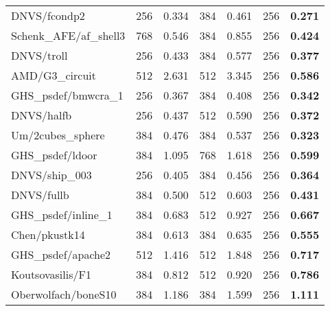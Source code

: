 \begin{tabular}{l|rr|rr|rr}
  DNVS/fcondp2                    & 256                              & 0.334                      & 384  & 0.461     & 256 & \bf 0.271  \\
  Schenk\_AFE/af\_shell3          & 768                              & 0.546                      & 384  & 0.855     & 256 & \bf 0.424  \\
  DNVS/troll                      & 256                              & 0.433                      & 384  & 0.577     & 256 & \bf 0.377  \\
  AMD/G3\_circuit                 & 512                              & 2.631                      & 512  & 3.345     & 256 & \bf 0.586  \\
  GHS\_psdef/bmwcra\_1            & 256                              & 0.367                      & 384  & 0.408     & 256 & \bf 0.342  \\
  DNVS/halfb                      & 256                              & 0.437                      & 512  & 0.590     & 256 & \bf 0.372  \\
  Um/2cubes\_sphere               & 384                              & 0.476                      & 384  & 0.537     & 256 & \bf 0.323  \\
  GHS\_psdef/ldoor                & 384                              & 1.095                      & 768  & 1.618     & 256 & \bf 0.599  \\
  DNVS/ship\_003                  & 256                              & 0.405                      & 384  & 0.456     & 256 & \bf 0.364  \\
  DNVS/fullb                      & 384                              & 0.500                      & 512  & 0.603     & 256 & \bf 0.431  \\
  GHS\_psdef/inline\_1            & 384                              & 0.683                      & 512  & 0.927     & 256 & \bf 0.667  \\
  Chen/pkustk14                   & 384                              & 0.613                      & 384  & 0.635     & 256 & \bf 0.555  \\
  GHS\_psdef/apache2              & 512                              & 1.416                      & 512  & 1.848     & 256 & \bf 0.717  \\
  Koutsovasilis/F1                & 384                              & 0.812                      & 512  & 0.920     & 256 & \bf 0.786  \\
  Oberwolfach/boneS10             & 384                              & 1.186                      & 384  & 1.599     & 256 & \bf 1.111  \\

\end{tabular}
